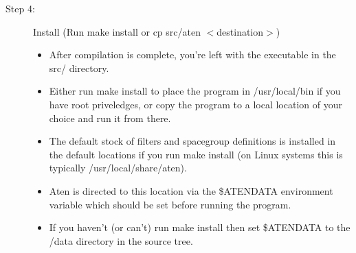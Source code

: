 \begin{description}
	\item[Step 4:\its] Install (Run {\sffamily make install} or {\sffamily cp src/aten $<$destination$>$})
	\begin{itemize}
		\item After compilation is complete, you're left with the \progname{} executable in the src/ directory.
		\item Either run {\sffamily make install} to place the program in {\sffamily /usr/local/bin} if you have root priveledges, or copy the program to a local location of your choice and run it from there.
		\item The default stock of filters and spacegroup definitions is installed in the default locations if you run {\sffamily make install} (on Linux systems this is typically /usr/local/share/aten).
		\item Aten is directed to this location via the \$ATENDATA environment variable which should be set before running the program.
		\item If you haven't (or can't) run {\sffamily make install} then set \$ATENDATA to the /data directory in the source tree.
	\end{itemize}
\end{description}


